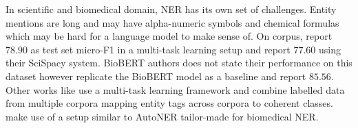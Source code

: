 In scientific and biomedical domain, NER has its own set of challenges. Entity mentions are long and may have alpha-numeric symbols and chemical formulas which may be hard for a language model to make sense of. On  corpus, \cite{crichton2017neural} report $78.90$ as test set micro-F1 in a multi-task learning setup and \cite{neumann2019scispacy} report $77.60$ using their SciSpacy system. BioBERT\cite{lee2020biobert} authors does not state their performance on this dataset however \cite{banerjee2019knowledge} replicate the BioBERT model as a baseline and report $85.56$. Other works like \cite{wang2019cross} use a multi-task learning framework and combine labelled data from multiple corpora mapping entity tags across corpora to coherent classes. \cite{wang2019distantly} make use of a setup similar to AutoNER\cite{shang2018learning} tailor-made for biomedical NER. 
